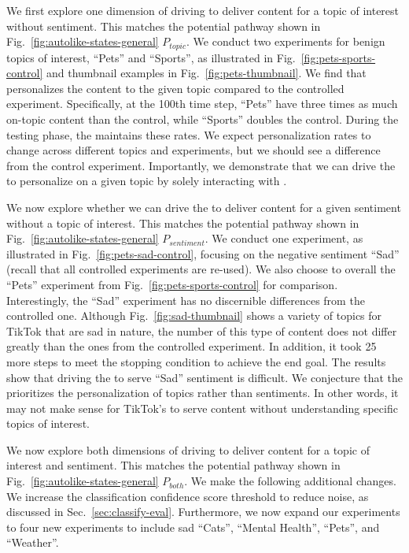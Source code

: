We first explore one dimension of driving \rs{} to deliver content for a topic of interest without sentiment. This matches the potential pathway shown in Fig.~\ref{fig:autolike-states-general} $P_{topic}$.
We conduct two experiments for benign topics of interest, ``Pets'' and ``Sports'', as illustrated in Fig.~\ref{fig:pets-sports-control} and thumbnail examples in Fig.~\ref{fig:pets-thumbnail}. 
We find that \autolike{} personalizes the content to the given topic compared to the controlled experiment. 
Specifically, at the \tilda{}100th time step, ``Pets'' have three times as much on-topic content than the control, while ``Sports'' doubles the control. During the testing phase, the \fyp{} maintains these rates. We expect personalization rates to change across different topics and experiments, but we should see a difference from the control experiment. 
Importantly, we demonstrate that we can drive the \rs{} to personalize on a given topic by solely interacting with \fyp{}.

We now explore whether we can drive the \rs{} to deliver content for a given sentiment without a topic of interest. This matches the potential pathway shown in Fig.~\ref{fig:autolike-states-general} $P_{sentiment}$.  
We conduct one experiment, as illustrated in Fig.~\ref{fig:pets-sad-control}, focusing on the negative sentiment ``Sad'' (recall that all controlled experiments are re-used). We also choose to overall the ``Pets'' experiment from Fig.~\ref{fig:pets-sports-control} for comparison.
Interestingly, the ``Sad'' experiment has no discernible differences from the controlled one. Although Fig.~\ref{fig:sad-thumbnail} shows a variety of topics for TikTok that are sad in nature, the number of this type of content does not differ greatly than the ones from the controlled experiment. 
In addition, it took \tilda{}25 more steps to meet the stopping condition to achieve the end goal. 
The results show that driving the \rs{} to serve ``Sad'' sentiment is difficult. We conjecture that the \rs{} prioritizes the personalization of topics rather than sentiments. In other words, it may not make sense for TikTok's \rs{} to serve content without understanding specific topics of interest. 

We now explore both dimensions of driving \rs{} to deliver content for a topic of interest and sentiment. This matches the potential pathway shown in Fig.~\ref{fig:autolike-states-general} $P_{both}$.
We make the following additional changes. We increase the classification confidence score threshold to reduce noise, as discussed in Sec.~\ref{sec:classify-eval}. Furthermore, we now expand our experiments to four new experiments to include sad ``Cats'', ``Mental Health'', ``Pets'', and ``Weather''. 

